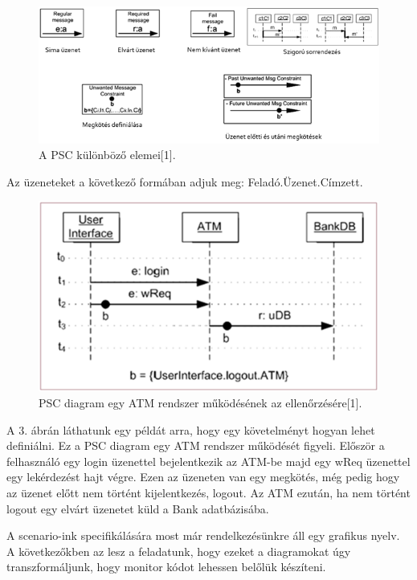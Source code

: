 \begin{figure}[!ht]
    \centering
    \includegraphics[width=150mm, keepaspectratio]{figures/2abra.png}
    \caption{A PSC különböző elemei[1].}
\end{figure}

Az üzeneteket a következő formában adjuk meg: Feladó.Üzenet.Címzett.

\begin{figure}[!ht]
    \centering
    \includegraphics[width=150mm, keepaspectratio]{figures/3abra.png}
    \caption{PSC diagram egy ATM rendszer működésének az ellenőrzésére[1].}
\end{figure}
A 3. ábrán láthatunk egy példát arra, hogy egy követelményt hogyan lehet definiálni. Ez a PSC diagram egy ATM rendszer működését figyeli. Először a felhasználó egy login üzenettel bejelentkezik az ATM-be majd egy wReq üzenettel egy lekérdezést hajt végre. Ezen az üzeneten van egy megkötés, még pedig hogy az üzenet előtt nem történt kijelentkezés, logout. Az ATM ezután, ha nem történt logout egy elvárt üzenetet küld a Bank adatbázisába.

A scenario-ink specifikálására most már rendelkezésünkre áll egy grafikus nyelv. A következőkben az lesz a feladatunk, hogy ezeket a diagramokat úgy transzformáljunk, hogy monitor kódot lehessen belőlük készíteni.
